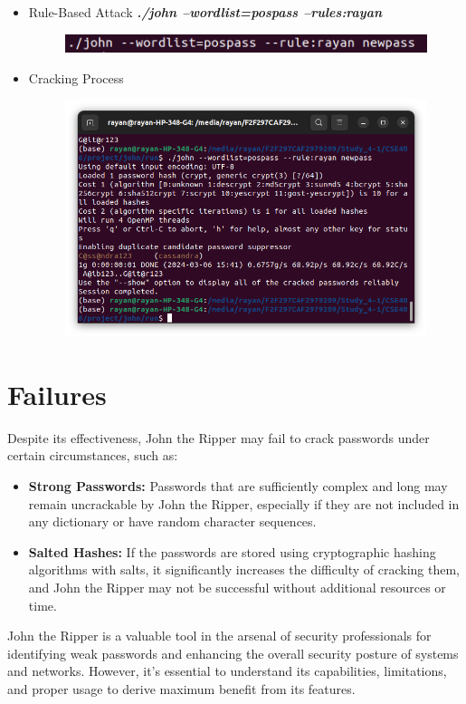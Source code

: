 \documentclass[12pt, A4Paper]{article}
\begin{document}
\begin{enumerate}
\begin{itemize}
\begin{figure}[H]
        \end{figure}
        \item Rule-Based Attack
        \textit{\textbf{./john --wordlist=pospass --rules:rayan}}
        \begin{figure}[H]
            \centering
            \includegraphics[width=\textwidth]{images/ruleAttack.png}
        \end{figure}
        
        \item Cracking Process
        \begin{figure}[H]
            \centering
            \includegraphics[width=\textwidth]{images/rule2.png}
        \end{figure}
    \end{itemize}
\end{enumerate}
\vspace{0.4cm}

\section{Failures}
Despite its effectiveness, John the Ripper may fail to crack passwords under certain circumstances, such as:

\begin{itemize}
    \item \textbf{Strong Passwords:}  Passwords that are sufficiently complex and long may remain uncrackable by John the Ripper, especially if they are not included in any dictionary or have random character sequences.
    \item \textbf{Salted Hashes:} If the passwords are stored using cryptographic hashing algorithms with salts, it significantly increases the difficulty of cracking them, and John the Ripper may not be successful without additional resources or time.
\end{itemize}
John the Ripper is a valuable tool in the arsenal of security professionals for identifying weak passwords and enhancing the overall security posture of systems and networks. However, it's essential to understand its capabilities, limitations, and proper usage to derive maximum benefit from its features.
\vspace{0.4cm}
\end{document}

